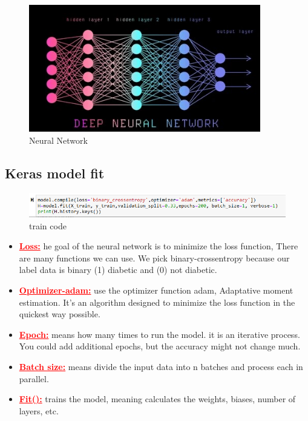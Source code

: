     \begin{figure}[htp]
        \centering
        \includegraphics[width=0.9\textwidth]{images/Layers.jpg }
        \caption{Neural Network }
        \label{fig:example4}
    \end{figure}
\subsection{Keras model fit}
\label{sec:Keras model fit}
    \begin{figure}[htp]
        \centering
        \includegraphics[width=1.3\textwidth]{images/compile.png }
        \caption{train code }
        \label{fig:example5}
    \end{figure}
  
    \begin{itemize}
        \item \textbf{\textcolor{red}{\Large\underline{Loss:}}}
        he goal of the neural network is to minimize the loss function,
        There are many functions we can use. We pick binary-crossentropy 
        because our label data is binary (1) diabetic and (0) not diabetic.

        \item \textbf{\textcolor{red}{\Large\underline{Optimizer-adam:}}}
        use the optimizer function adam, Adaptative moment estimation.
        It’s an algorithm designed to minimize the loss function in the quickest way possible.

        \item \textbf{\textcolor{red}{\Large\underline{Epoch:}}}
        means how many times to run the model. it is an iterative process.
         You could add additional epochs, but the accuracy might not change much. 
         
         \item \textbf{\textcolor{red}{\Large \underline{Batch size:}}}
         means divide the input data into n batches and process each in parallel.
         \item \textbf{\textcolor{red}{\Large\underline{Fit():}}}
        trains the model, meaning calculates the weights, biases, number of layers, etc.
    \end{itemize}
    
